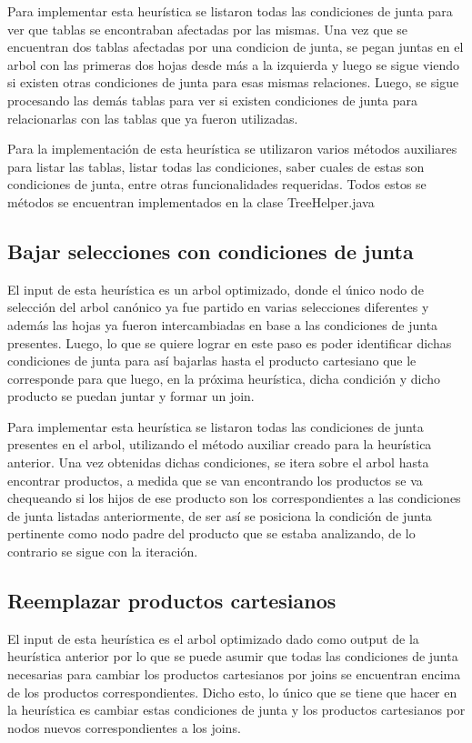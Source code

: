 \documentclass[a4paper,11pt]{article}
\begin{document}
Para implementar esta heurística se listaron todas las condiciones de junta para ver que tablas se encontraban afectadas por las mismas. Una vez que se encuentran dos tablas afectadas por una condicion de junta, se pegan juntas en el arbol con las primeras dos hojas desde más a la izquierda y luego se sigue viendo si existen otras condiciones de junta para esas mismas relaciones. Luego, se sigue procesando las demás tablas para ver si existen condiciones de junta para relacionarlas con las tablas que ya fueron utilizadas.

Para la implementación de esta heurística se utilizaron varios métodos auxiliares para listar las tablas, listar todas las condiciones, saber cuales de estas son condiciones de junta, entre otras funcionalidades requeridas. Todos estos se métodos se encuentran implementados en la clase TreeHelper.java

\subsection{Bajar selecciones con condiciones de junta}

El input de esta heurística es un arbol optimizado, donde el único nodo de selección del arbol canónico ya fue partido en varias selecciones diferentes y además las hojas ya fueron intercambiadas en base a las condiciones de junta presentes. Luego, lo que se quiere lograr en este paso es poder identificar dichas condiciones de junta para así bajarlas hasta el producto cartesiano que le corresponde para que luego, en la próxima heurística, dicha condición y dicho producto se puedan juntar y formar un join. 

Para implementar esta heurística se listaron todas las condiciones de junta presentes en el arbol, utilizando el método auxiliar creado para la heurística anterior. Una vez obtenidas dichas condiciones, se itera sobre el arbol hasta encontrar productos, a medida que se van encontrando los productos se va chequeando si los hijos de ese producto son los correspondientes a las condiciones de junta listadas anteriormente, de ser así se posiciona la condición de junta pertinente como nodo padre del producto que se estaba analizando, de lo contrario se sigue con la iteración.

\subsection{Reemplazar productos cartesianos}

El input de esta heurística es el arbol optimizado dado como output de la heurística anterior por lo que se puede asumir que todas las condiciones de junta necesarias para cambiar los productos cartesianos por joins se encuentran encima de los productos correspondientes. Dicho esto, lo único que se tiene que hacer en la heurística es cambiar estas condiciones de junta y los productos cartesianos por nodos nuevos correspondientes a los joins.
\end{document}
